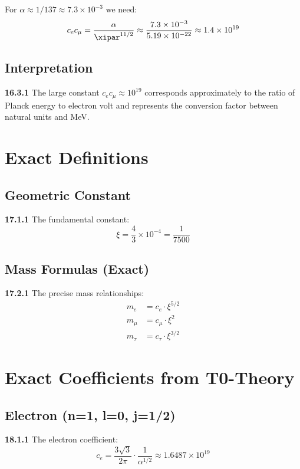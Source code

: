 For $\alpha \approx 1/137 \approx 7.3 \times 10^{-3}$ we need:
\begin{equation}
	c_e c_\mu = \frac{\alpha}{\xipar^{11/2}} \approx \frac{7.3 \times 10^{-3}}{5.19 \times 10^{-22}} \approx 1.4 \times 10^{19}
\end{equation}

\subsection{Interpretation}
\noindent \textbf{16.3.1} The large constant $c_e c_\mu \approx 10^{19}$ corresponds approximately to the ratio of Planck energy to electron volt and represents the conversion factor between natural units and MeV.

\section{Exact Definitions}

\subsection{Geometric Constant}
\noindent \textbf{17.1.1} The fundamental constant:
\begin{equation}
	\xi = \frac{4}{3} \times 10^{-4} = \frac{1}{7500}
\end{equation}

\subsection{Mass Formulas (Exact)}
\noindent \textbf{17.2.1} The precise mass relationships:
\begin{align}
	m_e &= c_e \cdot \xi^{5/2} \\
	m_\mu &= c_\mu \cdot \xi^2 \\
	m_\tau &= c_\tau \cdot \xi^{3/2}
\end{align}

\section{Exact Coefficients from T0-Theory}

\subsection{Electron (n=1, l=0, j=1/2)}
\noindent \textbf{18.1.1} The electron coefficient:
\begin{equation}
	c_e = \frac{3\sqrt{3}}{2\pi} \cdot \frac{1}{\alpha^{1/2}} \approx 1.6487 \times 10^{19}
\end{equation}

